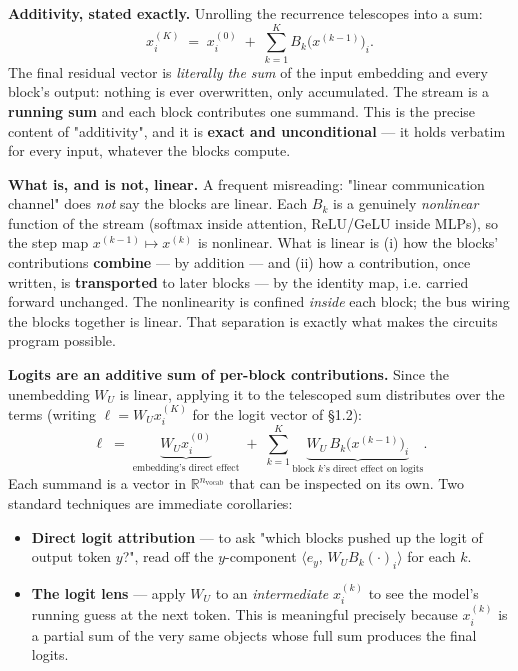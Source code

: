 \textbf{Additivity, stated exactly.} Unrolling the recurrence telescopes into a sum: \[ x_i^{(K)} \;=\; x_i^{(0)} \;+\; \sum_{k=1}^{K} B_k\!\big(x^{(k-1)}\big)_i. \] The final residual vector is \emph{literally the sum} of the input embedding and every block's output: nothing is ever overwritten, only accumulated. The stream is a \textbf{running sum} and each block contributes one summand. This is the precise content of "additivity", and it is \textbf{exact and unconditional} --- it holds verbatim for every input, whatever the blocks compute.


\textbf{What is, and is not, linear.} A frequent misreading: "linear communication channel" does \emph{not} say the blocks are linear. Each $B_k$ is a genuinely \emph{nonlinear} function of the stream (softmax inside attention, ReLU/GeLU inside MLPs), so the step map $x^{(k-1)} \mapsto x^{(k)}$ is nonlinear. What is linear is (i) how the blocks' contributions \textbf{combine} --- by addition --- and (ii) how a contribution, once written, is \textbf{transported} to later blocks --- by the identity map, i.e. carried forward unchanged. The nonlinearity is confined \emph{inside} each block; the bus wiring the blocks together is linear. That separation is exactly what makes the circuits program possible.


\textbf{Logits are an additive sum of per-block contributions.} Since the unembedding $W_U$ is linear, applying it to the telescoped sum distributes over the terms (writing $\ell = W_U x_i^{(K)}$ for the logit vector of §1.2): \[ \ell \;=\; \underbrace{W_U x_i^{(0)}}_{\text{embedding's direct effect}} \;+\; \sum_{k=1}^{K} \underbrace{W_U\, B_k\!\big(x^{(k-1)}\big)_i}_{\text{block }k\text{'s direct effect on logits}}. \] Each summand is a vector in $\mathbb{R}^{n_{\text{vocab}}}$ that can be inspected on its own. Two standard techniques are immediate corollaries:

\begin{itemize}
\item \textbf{Direct logit attribution} --- to ask "which blocks pushed up the logit of output token $y$?", read off the $y$-component $\langle e_y,\, W_U B_k(\cdot)_i\rangle$ for each $k$.
\item \textbf{The logit lens} --- apply $W_U$ to an \emph{intermediate} $x_i^{(k)}$ to see the model's running guess at the next token. This is meaningful precisely because $x_i^{(k)}$ is a partial sum of the very same objects whose full sum produces the final logits.
\end{itemize}


